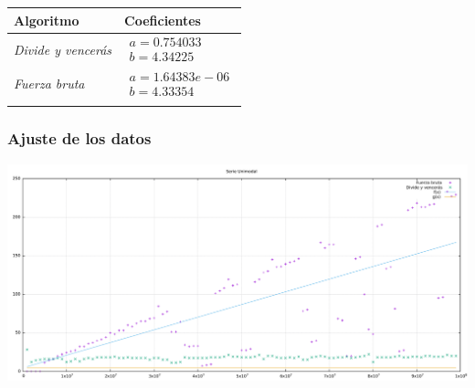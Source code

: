 \documentclass[compress]{beamer}
\begin{document}
\begin{frame}
	\begin{center}
	\begin{tabular}{ll}
	Algoritmo & Coeficientes\\ \hline\noalign{\smallskip}
	\textit{Divide y vencerás} & $\begin{array}{ll}
	a = 0.754033 \\
b = 4.34225 
\end{array}$ \\\hline\noalign{\smallskip}
	\textit{Fuerza bruta} & $\begin{array}{ll}
	a = 1.64383e-06 \\
b = 4.33354

\end{array}$ \\\hline\noalign{\smallskip}
\end{tabular}
\end{center}
\end{frame}

\begin{frame}
  \frametitle{Ajuste de los datos}
  \begin{center}
  \includegraphics[scale=0.23]{ajuste.pdf}
\end{center}
\end{frame}
\end{document}
